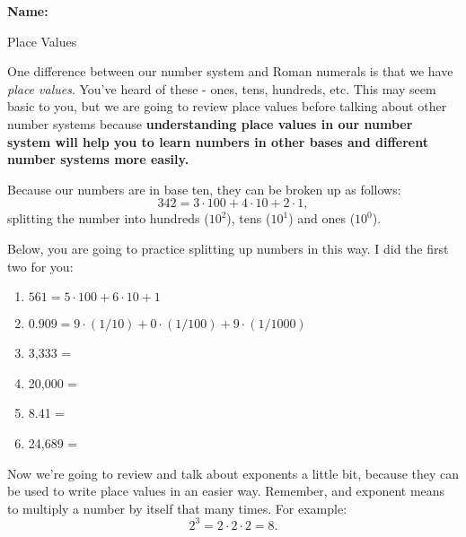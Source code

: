 \documentclass{article}
\begin{document}
\noindent\textbf{Name:}

\vspace{0.2in}

\begin{center}
\Large{Place Values}
\end{center}

\vspace{0.2in}
\noindent One difference between our number system and Roman numerals is that we have \textit{place values}.  You've heard of these - ones, tens, hundreds, etc.
This may seem basic to you, but we are going to review place values before talking about other number systems because
\textbf{understanding place values in our number system will help you to learn numbers in other bases and different number systems more easily.}

\vspace{0.2in}

\noindent Because our numbers are in base ten, they can be broken up as follows:  
\[342 = 3\cdot100 + 4\cdot 10 +2\cdot1,\]
splitting the number into hundreds ($10^2$), tens ($10^1$) and ones ($10^0$).

\vspace{1in}

\noindent Below, you are going to practice splitting up numbers in this way. I did the first two for you:
\begin{enumerate}
\item $561=5\cdot100 + 6\cdot 10 +1$
\vspace{0.3in}
\item $0.909=9\cdot(1/10) + 0\cdot (1/100) +9\cdot(1/1000)$
\vspace{0.3in}
\item 3,333 =
\vspace{0.3in}
\item 20,000 =
\vspace{0.3in}
\item 8.41 =
\vspace{0.3in}
\item 24,689 =
\end{enumerate}
   
\newpage

\noindent Now we're going to review and talk about exponents a little bit, because they can be used to write place values in an easier way. Remember, and exponent means to multiply a number by itself that many times. For example:
\[2^3=2\cdot2\cdot2=8.\]

\vspace{0.2in}
\end{document}

